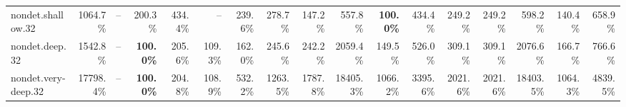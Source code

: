 \documentclass[varwidth,border=2pt]{standalone}
\begin{document}
\begin{center}
{\begin{tabular}{lrrrrrrrrrrrrrrrr}
nondet.shallow.32 & 1064.7\% & -- & 200.3\% & 434.4\% & -- & 239.6\% & 278.7\% & 147.2\% & 557.8\% & \textbf{100.0\%} & 434.4\% & 249.2\% & 249.2\% & 598.2\% & 140.4\% & 658.9\% \\
nondet.deep.32 & 1542.8\% & -- & \textbf{100.0\%} & 205.6\% & 109.3\% & 162.0\% & 245.6\% & 242.2\% & 2059.4\% & 149.5\% & 526.0\% & 309.1\% & 309.1\% & 2076.6\% & 166.7\% & 766.6\% \\
nondet.very-deep.32 & 17798.4\% & -- & \textbf{100.0\%} & 204.8\% & 108.9\% & 532.2\% & 1263.5\% & 1787.8\% & 18405.3\% & 1066.2\% & 3395.6\% & 2021.6\% & 2021.6\% & 18403.5\% & 1064.3\% & 4839.5\% \\
\bottomrule
\end{tabular}
}
\end{center}
\end{document}
